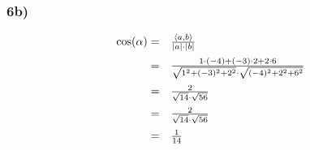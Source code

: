 \subsubsection*{6b)}
\begin{equation*}
  \begin{array}{ r l }
    \cos( \alpha ) = & \frac{\langle a,b\rangle }{|a|\cdot |b|}\vspace{2mm}\\
    = & \frac{1\cdot ( -4) +( -3) \cdot 2+2\cdot 6}{\sqrt{1^{2} +( -3)^{2} +2^{2}} \cdot \sqrt{( -4)^{2} +2^{2} +6^{2}}}\vspace{2mm}\\
    = & \frac{2}{\sqrt{1 4} \cdot \sqrt{56}}\vspace{2mm}\\
    = & \frac{2}{\sqrt{1 4} \cdot \sqrt{56}}\vspace{2mm}\\
    = & \frac{1}{14}
  \end{array}
\end{equation*}